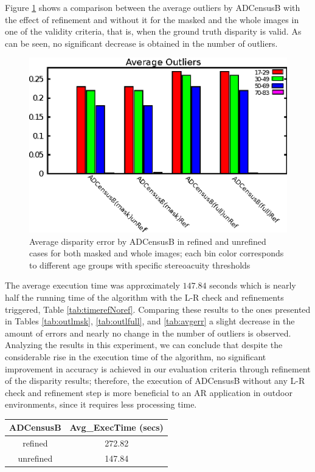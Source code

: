 Figure \ref{fig:outlnoref} shows a comparison between the average outliers by ADCensusB with the effect of refinement and without it for the masked and the whole images 
in one of the validity criteria, that is, when the ground truth disparity is valid. As can be seen, no significant decrease is obtained in the number of outliers.

\begin{figure}[H]
\centering
\includegraphics[scale=0.95]{adcrefNoref}
\caption{Average disparity error by ADCensusB in refined and unrefined cases for both masked and whole images; each bin color corresponds to different age groups
with specific stereoacuity thresholds}
\label{fig:outlnoref}
\end{figure} 

The average execution time was approximately $147.84$ seconds which is nearly half the running time of the algorithm with the L-R check and refinements 
triggered, Table \ref{tab:timerefNoref}. 
Comparing these results to the ones presented in Tables \ref{tab:outlmsk}, \ref{tab:outlfull}, and \ref{tab:avgerr} a slight decrease in the amount of errors and 
nearly no change in the number of outliers is observed.
Analyzing the results in this experiment, we can conclude that despite the considerable rise in the execution time of the algorithm, no significant
improvement in accuracy is achieved in our evaluation criteria through refinement of the disparity results; therefore, the execution of ADCensusB without any L-R check and
refinement step is more beneficial to an AR application in outdoor environments, since it requires less processing time.\newline

\begin{minipage}{\linewidth}
\begin{center}
\label{tab:timerefNoref}
\begin{tabular}{|c|c|}
\hline
ADCensusB & Avg\_ExecTime (secs) \\ \hline
refined & 272.82 \\  \hline
unrefined & 147.84 \\ \hline
\end{tabular}
\end{center}
\end{minipage} \newline

